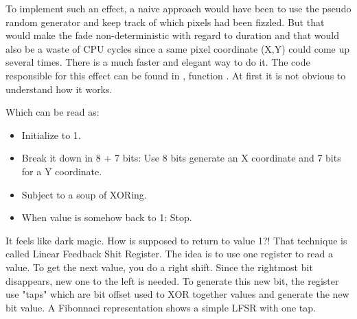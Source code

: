 To implement such an effect, a naive approach would have been to use the pseudo random generator  and keep track of which pixels had been fizzled. But that would make the fade non-deterministic with regard to duration and that would also be a waste of CPU cycles since a same pixel coordinate (X,Y) could come up several times. There is a much faster and elegant way to do it. The code responsible for this effect can be found in , function . At first it is not obvious to understand how it works.\\
\par
\begin{minipage}{\textwidth}

\end{minipage}
\par
Which can be read as:\\
\begin{itemize}
\item Initialize  to 1.
\item Break it down in 8 + 7 bits: Use 8 bits generate an X coordinate and 7 bits for a Y coordinate.
\item Subject  to a soup of XORing.
\item When  value is somehow back to 1: Stop.
\end{itemize}        
It feels like dark magic. How is  supposed to return to value 1?! That technique is called Linear Feedback Shit Register. The idea is to use one register to read a value. To get the next value, you do a right shift. Since the rightmost bit disappears, new one to the left is needed. To generate this new bit, the register use "taps" which are bit offset used to XOR together values and generate the new bit value. A Fibonnaci representation shows a simple LFSR with one tap.\\
\par

